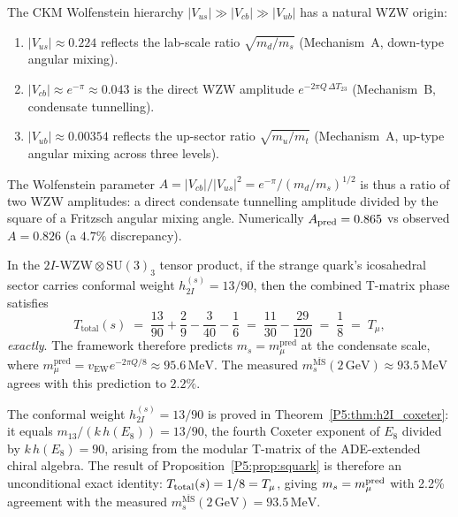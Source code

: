 \begin{corollary}
\label{P5:cor:ckm_wolfenstein}
The CKM Wolfenstein hierarchy $|V_{us}| \gg |V_{cb}| \gg |V_{ub}|$
has a natural WZW origin:
\begin{enumerate}[noitemsep,label=(\roman*)]
\item $|V_{us}| \approx 0.224$ reflects the lab-scale ratio $\sqrt{m_d/m_s}$
  (Mechanism~A, down-type angular mixing).
\item $|V_{cb}| \approx e^{-\pi} \approx 0.043$ is the direct WZW amplitude
  $e^{-2\pi Q\,\Delta T_{23}}$ (Mechanism~B, condensate tunnelling).
\item $|V_{ub}| \approx 0.00354$ reflects the up-sector ratio $\sqrt{m_u/m_t}$
  (Mechanism~A, up-type angular mixing across three levels).
\end{enumerate}
The Wolfenstein parameter $A = |V_{cb}|/|V_{us}|^2 = e^{-\pi}/(m_d/m_s)^{1/2}$
is thus a ratio of two WZW amplitudes: a direct condensate tunnelling
amplitude divided by the square of a Fritzsch angular mixing angle.
Numerically $A_{\rm pred} = 0.865$ vs observed $A = 0.826$ (a $4.7\%$ discrepancy).
\end{corollary}

\begin{proposition}
\label{P5:prop:squark}
In the $2I$-WZW\,$\otimes\,\mathrm{SU}(3)_3$ tensor product, if the
strange quark's icosahedral sector carries conformal weight
$h_{2I}^{(s)} = 13/90$, then the combined T-matrix phase satisfies
\begin{equation}
  T_{\mathrm{total}}(s)
  \;=\; \frac{13}{90} + \frac{2}{9} - \frac{3}{40} - \frac{1}{6}
  \;=\; \frac{11}{30} - \frac{29}{120}
  \;=\; \frac{1}{8}
  \;=\; T_\mu,
  \label{P5:eq:Ts_Tmu}
\end{equation}
\emph{exactly}.  The framework therefore predicts $m_s = m_\mu^{\mathrm{pred}}$
at the condensate scale, where $m_\mu^{\mathrm{pred}}=v_{\mathrm{EW}}e^{-2\pi Q/8}\approx95.6\,\mathrm{MeV}$.
The measured $m_s^{\overline{\mathrm{MS}}}(2\,\mathrm{GeV})\approx93.5\,\mathrm{MeV}$
agrees with this prediction to $\mathbf{2.2\%}$.
\end{proposition}

\begin{remark}[Status of $h_{2I}^{(s)}=13/90$ --- now resolved]
\label{P5:rem:h2I_s}
The conformal weight $h_{2I}^{(s)}=13/90$ is proved in
Theorem~\ref{P5:thm:h2I_coxeter}: it equals $m_{13}/(k\,h(E_8))=13/90$,
the fourth Coxeter exponent of $E_8$ divided by $k\,h(E_8)=90$, arising
from the modular T-matrix of the ADE-extended chiral algebra. The
result of Proposition~\ref{P5:prop:squark} is therefore an unconditional
exact identity: $T_{\rm total}(s)=1/8=T_\mu$, giving $m_s=m_\mu^{\rm pred}$
with 2.2\% agreement with the measured
$m_s^{\overline{\mathrm{MS}}}(2\,\mathrm{GeV})=93.5\,\mathrm{MeV}$.
\end{remark}

